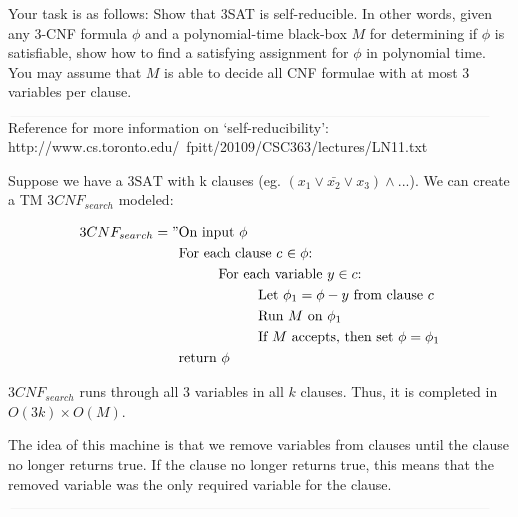\documentclass{article}
\newcommand{\class}[1]{\text{#1}}
\newcommand\tab[1][1cm]{\hspace*{#1}}
\begin{document}
\begin{enumerate}
Your task is as follows: Show that 3SAT is self-reducible. In other words, given any 3-CNF formula $\phi$ and a polynomial-time black-box $M$ for determining if $\phi$ is satisfiable, show how to find a satisfying assignment for $\phi$ in polynomial time. You may assume that $M$ is able to decide all CNF formulae with {at most} 3 variables per clause.

            $\textcolor[RGB]{220,220,220}{\rule{\linewidth}{0.2pt}}$
            Reference for more information on `self-reducibility': http://www.cs.toronto.edu/~fpitt/20109/CSC363/lectures/LN11.txt

            Suppose we have a $\class{3SAT}$ with k clauses (eg. $(x_1 \vee \bar{x_2} \vee x_3) \wedge . . .$). We can create a TM $3CNF_{search}$ modeled:


            \begin{equation}
            	\begin{split}
            		3CNF_{search} = "& \text{On input $\phi$} \\
            				         & \text{For each clause $c$ $\in \phi$:} \\
                                     & \tab\text{For each variable $y \in c$:} \\
                                     & \tab\tab\text{Let $\phi_1 = \phi - y$ from clause $c$} \\
                                     & \tab\tab\text{Run $M$ on $\phi_1$} \\
                                     & \tab\tab\text{If $M$ accepts, then set $\phi = \phi_1$} \\
                                     & \text{return $\phi$}
            	\end{split}
            \end{equation}

            $3CNF_{search}$ runs through all 3 variables in all $k$ clauses. Thus, it is completed in $O(3k) \times O(M)$.

            The idea of this machine is that we remove variables from clauses until the clause no longer returns true. If the clause no longer returns true, this means that the removed variable was the only required variable for the clause.

            $\textcolor[RGB]{220,220,220}{\rule{\linewidth}{0.2pt}}$

\end{enumerate}
\end{document}
